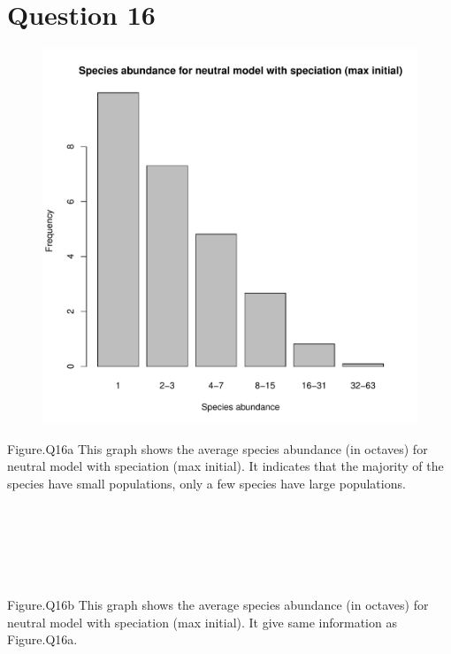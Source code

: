 \documentclass[12pt,a4paper]{article}
\begin{document}
\newpage

\section{Question 16}
\begin{figure}[h]
\centering
\includegraphics[width=\textwidth]{Q16Plot1.pdf}
\end{figure}
Figure.Q16a This graph shows the average species abundance (in octaves) for neutral model with speciation (max initial). 
It indicates that the majority of the species have small populations, only a few species have large populations.
\\
\\
\\
\\
\\
\\
\\
Figure.Q16b This graph shows the average species abundance (in octaves) for neutral model with speciation (max initial). 
It give same information as Figure.Q16a.
\end{document}
